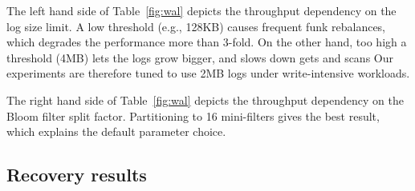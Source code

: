 The left hand side of 
Table~\ref{fig:wal} depicts the throughput dependency on the log size limit. A low threshold (e.g., 128KB) 
causes frequent funk rebalances, which degrades the performance more than 3-fold. On the other hand, too high a threshold (4MB) 
lets the logs grow bigger, and slows down gets and scans Our experiments are therefore tuned to use 2MB logs under write-intensive 
workloads.

The right hand side of 
Table~\ref{fig:wal} depicts the throughput dependency on the Bloom filter split factor. 
Partitioning to 16 mini-filters gives the best result, which explains the default parameter choice. 



\subsection{Recovery results}
\label{ssec:recover} 
